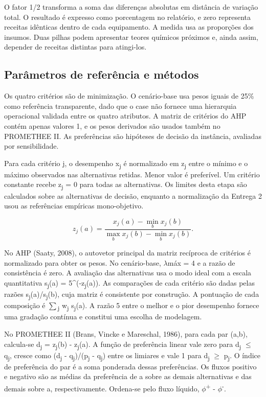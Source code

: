 \documentclass[12pt,a4paper]{article}
\begin{document}
O fator 1/2 transforma a soma das diferenças absolutas em distância de variação total. O resultado é expresso como porcentagem no relatório, e zero representa receitas idênticas dentro de cada equipamento. A medida usa as proporções dos insumos. Duas pilhas podem apresentar teores químicos próximos e, ainda assim, depender de receitas distintas para atingi-los.

\clearpage

\subsection{Parâmetros de referência e métodos}

Os quatro critérios são de minimização. O cenário-base usa pesos iguais de 25\% como referência transparente, dado que o case não fornece uma hierarquia operacional validada entre os quatro atributos. A matriz de critérios do AHP contém apenas valores 1, e os pesos derivados são usados também no PROMETHEE II. As preferências são hipóteses de decisão da instância, avaliadas por sensibilidade.

Para cada critério j, o desempenho x\textsubscript{j} é normalizado em z\textsubscript{j} entre o mínimo e o máximo observados nas alternativas retidas. Menor valor é preferível. Um critério constante recebe z\textsubscript{j} = 0 para todas as alternativas. Os limites desta etapa são calculados sobre as alternativas de decisão, enquanto a normalização da Entrega 2 usou as referências empíricas mono-objetivo.

\[z_j(a)=\frac{x_j(a)-\min_b x_j(b)}{\max_b x_j(b)-\min_b x_j(b)}.\]

No AHP (Saaty, 2008), o autovetor principal da matriz recíproca de critérios é normalizado para obter os pesos. No cenário-base, \(\lambda\)máx = 4 e a razão de consistência é zero. A avaliação das alternativas usa o modo ideal com a escala quantitativa s\textsubscript{j}(a) = 5^(-z\textsubscript{j}(a)). As comparações de cada critério são dadas pelas razões s\textsubscript{j}(a)/s\textsubscript{j}(b), cuja matriz é consistente por construção. A pontuação de cada composição é \(\sum\)\textsubscript{j} w\textsubscript{j} s\textsubscript{j}(a). A razão 5 entre o melhor e o pior desempenho fornece uma gradação contínua e constitui uma escolha de modelagem.

No PROMETHEE II (Brans, Vincke e Mareschal, 1986), para cada par (a,b), calcula-se d\textsubscript{j} = z\textsubscript{j}(b) - z\textsubscript{j}(a). A função de preferência linear vale zero para d\textsubscript{j} \(\leq\) q\textsubscript{j}, cresce como (d\textsubscript{j} - q\textsubscript{j})/(p\textsubscript{j} - q\textsubscript{j}) entre os limiares e vale 1 para d\textsubscript{j} \(\geq\) p\textsubscript{j}. O índice de preferência do par é a soma ponderada dessas preferências. Os fluxos positivo e negativo são as médias da preferência de a sobre as demais alternativas e das demais sobre a, respectivamente. Ordena-se pelo fluxo líquido, \(\phi\)\textsuperscript{+} - \(\phi\)\textsuperscript{-}.
\end{document}
